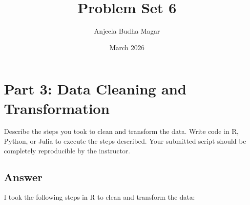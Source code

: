\documentclass{article}
\title{Problem Set 6}
\author{Anjeela Budha Magar}
\date{March 2026}
\begin{document}
\maketitle

\section*{Part 3: Data Cleaning and Transformation}

Describe the steps you took to clean and transform the data. Write code in R,
Python, or Julia to execute the steps described. Your submitted script
should be completely reproducible by the instructor.
\subsection*{Answer}
I took the following steps in R to clean and transform the data:
\end{document}
